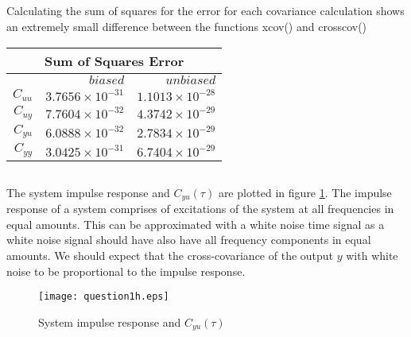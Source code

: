 \documentclass[times,12pt,reqno]{amsart}
\begin{document}
\subsection{}
Calculating the sum of squares for the error for each covariance calculation
shows an extremely small difference between the functions xcov() and
crosscov()

\begin{center}
    \begin{tabular} {|r|r|r|}
        \hline
        \multicolumn{3}{|c|}{Sum of Squares Error} \\
        \hline
        \nonumber & ${biased}$ & ${unbiased}$ \\
        \hline
        $C_{uu}$ & $3.7656 \times 10^{-31}$ & $1.1013 \times 10^{-28}$ \\
        $C_{uy}$ & $7.7604 \times 10^{-32}$ & $4.3742 \times 10^{-29}$ \\
        $C_{yu}$ & $6.0888 \times 10^{-32}$ & $2.7834 \times 10^{-29}$ \\
        $C_{yy}$ & $3.0425 \times 10^{-31}$ & $6.7404 \times 10^{-29}$ \\
        \hline
    \end{tabular}
\end{center}

\subsection{}
The system impulse response and $C_{yu}(\tau)$ are plotted in figure
\ref{fig:q1h}. The impulse response of a system comprises of excitations of
the system at all frequencies in equal amounts. This can be approximated with a
white noise time signal as a white noise signal should have also have all
frequency components in equal amounts. We should expect that the
cross-covariance of the output $y$ with white noise to be proportional to the
impulse response.
\begin{figure}[H]
    \begin{center}
        \texttt{[image: question1h.eps]}
    \end{center}
    \caption{System impulse response and $C_{yu}(\tau)$}
    \label{fig:q1h}
\end{figure}

\end{document}
